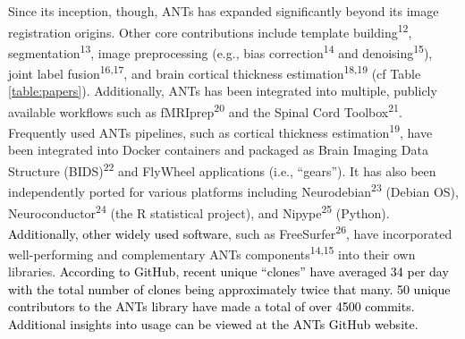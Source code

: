 \documentclass[12pt,]{article}
\begin{document}
Since its inception, though, ANTs has expanded significantly beyond its
image registration origins. Other core contributions include template
building\textsuperscript{12}, segmentation\textsuperscript{13}, image
preprocessing (e.g., bias correction\textsuperscript{14} and
denoising\textsuperscript{15}), joint label
fusion\textsuperscript{16,17}, and brain cortical thickness
estimation\textsuperscript{18,19} (cf Table \ref{table:papers}).
Additionally, ANTs has been integrated into multiple, publicly available
workflows such as fMRIprep\textsuperscript{20} and the Spinal Cord
Toolbox\textsuperscript{21}. Frequently used ANTs pipelines, such as
cortical thickness estimation\textsuperscript{19}, have been integrated
into Docker containers and packaged as Brain Imaging Data Structure
(BIDS)\textsuperscript{22} and FlyWheel applications (i.e., ``gears'').
It has also been independently ported for various platforms including
Neurodebian\textsuperscript{23} (Debian OS),
Neuroconductor\textsuperscript{24} (the R statistical project), and
Nipype\textsuperscript{25} (Python).
\textcolor{black}{Additionally, other widely
used software}, such as FreeSurfer\textsuperscript{26}, have
incorporated well-performing and complementary ANTs
components\textsuperscript{14,15} into their own libraries.
\textcolor{black}{According to GitHub, recent
unique “clones” have averaged 34 per day with the total number of clones being
approximately twice that many.  50 unique contributors to the ANTs library have
made a total of over 4500 commits. Additional insights into usage can be viewed
at the ANTs GitHub website.}


\end{document}
